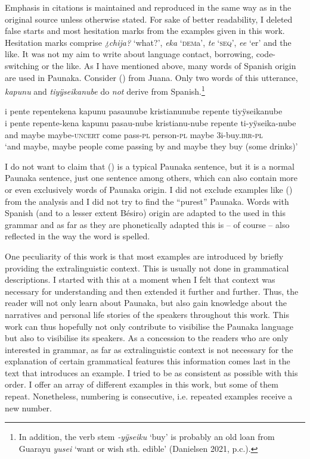Emphasis in citations is maintained and reproduced in the same way as in the original source unless otherwise stated. For sake of better readability, I deleted false starts and most hesitation marks from the examples given in this work. Hesitation marks comprise \textit{¿chija?} ‘what?’, \textit{eka} ‘\textsc{dem}a’, \textit{te} ‘\textsc{seq}’, \textit{ee} ‘er’ and the like. It was not my aim to write about language contact, borrowing, code-switching or the like. As I have mentioned above, many words of Spanish origin are used in Paunaka. Consider () from Juana. Only two words of this utterance, \textit{kapunu} and \textit{tiyÿseikanube} do \textit{not} derive from Spanish.\footnote{\label{fn:yusei}In addition, the verb stem \textit{-yÿseiku} ‘buy’ is probably an old loan from Guarayu \textit{yusei} ‘want or wish sth. edible’ (Danielsen 2021, p.c.).}

\ea\label{ex:kristianunube-1}
\begingl 
\glpreamble i pente repentekena kapunu pasaunube kristianunube repente tiyÿseikanube\\
\gla i pente repente-kena kapunu pasau-nube kristianu-nube repente ti-yÿseika-nube\\
\glb and maybe maybe-\textsc{uncert} come pass-\textsc{pl} person-\textsc{pl} maybe 3i-buy.\textsc{irr}-\textsc{pl}\\ 
\glft ‘and maybe, maybe people come passing by and maybe they buy (some drinks)’\\
\endgl
\trailingcitation{[jxx-e110923l-2.11]}
\xe

I do not want to claim that () is a typical Paunaka sentence, but it is a normal Paunaka sentence, just one sentence among others, which can also contain more or even exclusively words of Paunaka origin. I did not exclude examples like () from the analysis and I did not try to find the “purest” Paunaka. Words with Spanish (and to a lesser extent Bésiro) origin are adapted to the  used in this grammar and as far as they are phonetically adapted this is – of course – also reflected in the way the word is spelled.

One peculiarity of this work is that most examples are introduced by briefly providing the extralinguistic context. This is usually not done in grammatical descriptions. I started with this at a moment when I felt that context was necessary for understanding and then extended it further and further. Thus, the reader will not only learn about Paunaka, but also gain knowledge about the narratives and personal life stories of the speakers throughout this work. This work can thus hopefully not only contribute to visibilise the Paunaka language but also to visibilise its speakers. As a concession to the readers who are only interested in grammar, as far as extralinguistic context is not necessary for the explanation of certain grammatical features this information comes last in the text that introduces an example. I tried to be as consistent as possible with this order. I offer an array of different examples in this work, but some of them repeat. Nonetheless, numbering is consecutive, i.e. repeated examples receive a new number.


